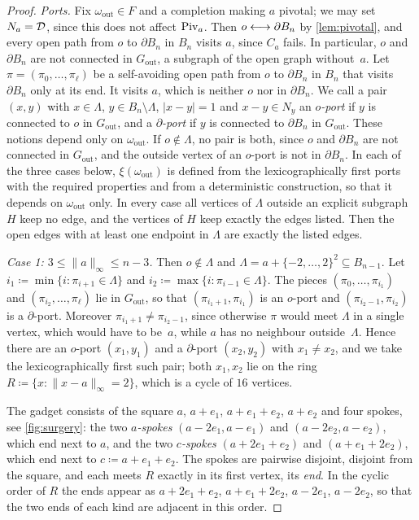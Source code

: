 \documentclass[11pt,letterpaper]{article}
\begin{document}
\begin{proof}
\emph{Ports.} Fix $\omega_{\mathrm{out}}\in F$ and a completion making $a$ pivotal; we may set $N_a=\mathcal D$, since this does not affect $\mathrm{Piv}_a$. Then $o\longleftrightarrow\partial B_n$ by \cref{lem:pivotal}, and every open path from $o$ to $\partial B_n$ in $B_n$ visits $a$, since $C_a$ fails. In particular, $o$ and $\partial B_n$ are not connected in $G_{\mathrm{out}}$, a subgraph of the open graph without~$a$. Let $\pi=(\pi_0,\dots,\pi_\ell)$ be a self-avoiding open path from $o$ to $\partial B_n$ in $B_n$ that visits $\partial B_n$ only at its end. It visits $a$, which is neither $o$ nor in $\partial B_n$. We call a pair $(x,y)$ with $x\in\Lambda$, $y\in B_n\setminus\Lambda$, $|x-y|=1$ and $x-y\in N_y$ an \emph{$o$-port} if $y$ is connected to $o$ in $G_{\mathrm{out}}$, and a \emph{$\partial$-port} if $y$ is connected to $\partial B_n$ in $G_{\mathrm{out}}$. These notions depend only on $\omega_{\mathrm{out}}$. If $o\notin\Lambda$, no pair is both, since $o$ and $\partial B_n$ are not connected in $G_{\mathrm{out}}$, and the outside vertex of an $o$-port is not in $\partial B_n$. In each of the three cases below, $\xi(\omega_{\mathrm{out}})$ is defined from the lexicographically first ports with the required properties and from a deterministic construction, so that it depends on $\omega_{\mathrm{out}}$ only. In every case all vertices of $\Lambda$ outside an explicit subgraph $H$ keep no edge, and the vertices of $H$ keep exactly the edges listed. Then the open edges with at least one endpoint in $\Lambda$ are exactly the listed edges.

\emph{Case 1: $3\le\|a\|_\infty\le n-3$.} Then $o\notin\Lambda$ and $\Lambda=a+\{-2,\dots,2\}^2\subseteq B_{n-1}$. Let $i_1\coloneqq\min\{i\colon\pi_{i+1}\in\Lambda\}$ and $i_2\coloneqq\max\{i\colon\pi_{i-1}\in\Lambda\}$. The pieces $(\pi_0,\dots,\pi_{i_1})$ and $(\pi_{i_2},\dots,\pi_\ell)$ lie in $G_{\mathrm{out}}$, so that $(\pi_{i_1+1},\pi_{i_1})$ is an $o$-port and $(\pi_{i_2-1},\pi_{i_2})$ is a $\partial$-port. Moreover $\pi_{i_1+1}\neq\pi_{i_2-1}$, since otherwise $\pi$ would meet $\Lambda$ in a single vertex, which would have to be~$a$, while $a$ has no neighbour outside~$\Lambda$. Hence there are an $o$-port $(x_1,y_1)$ and a $\partial$-port $(x_2,y_2)$ with $x_1\neq x_2$, and we take the lexicographically first such pair; both $x_1,x_2$ lie on the ring $R\coloneqq\{x\colon\|x-a\|_\infty=2\}$, which is a cycle of $16$ vertices.

The gadget consists of the square $a$, $a+e_1$, $a+e_1+e_2$, $a+e_2$ and four spokes, see \cref{fig:surgery}: the two \emph{$a$-spokes} $(a-2e_1,a-e_1)$ and $(a-2e_2,a-e_2)$, which end next to $a$, and the two \emph{$c$-spokes} $(a+2e_1+e_2)$ and $(a+e_1+2e_2)$, which end next to $c\coloneqq a+e_1+e_2$. The spokes are pairwise disjoint, disjoint from the square, and each meets $R$ exactly in its first vertex, its \emph{end}. In the cyclic order of $R$ the ends appear as $a+2e_1+e_2$, $a+e_1+2e_2$, $a-2e_1$, $a-2e_2$, so that the two ends of each kind are adjacent in this order.


\end{proof}
\end{document}
